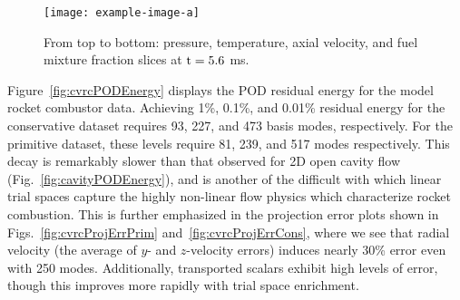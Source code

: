 \begin{figure}
\begin{minipage}{0.99\linewidth}
		\fi
	\end{minipage}
	\begin{minipage}{0.99\linewidth}
		\ifdefined\DRAFT
			\texttt{[image: example-image-a]}
		\else
		\fi
	\end{minipage}
	\caption{\label{fig:cvrcFOMSlices}From top to bottom: pressure, temperature, axial velocity, and fuel mixture fraction slices at $\text{t} = 5.6$ ms.}
\end{figure}

Figure~\ref{fig:cvrcPODEnergy} displays the POD residual energy for the model rocket combustor data. Achieving 1\%, 0.1\%, and 0.01\% residual energy for the conservative dataset requires 93, 227, and 473 basis modes, respectively. For the primitive dataset, these levels require 81, 239, and 517 modes respectively. This decay is remarkably slower than that observed for 2D open cavity flow (Fig.~\ref{fig:cavityPODEnergy}), and is another of the difficult with which linear trial spaces capture the highly non-linear flow physics which characterize rocket combustion. This is further emphasized in the projection error plots shown in Figs.~\ref{fig:cvrcProjErrPrim} and~\ref{fig:cvrcProjErrCons}, where we see that radial velocity (the average of $y$- and $z$-velocity errors) induces nearly 30\% error even with 250 modes. Additionally, transported scalars exhibit high levels of error, though this improves more rapidly with trial space enrichment.

